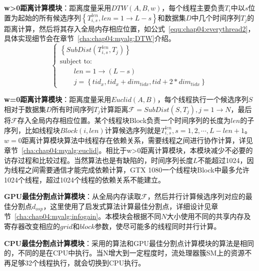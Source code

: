 \textbf{w>0距离计算模块}：距离度量采用$DTW(A,B,w)$，每个线程主要负责$T_i$中以$s$位置为起始的所有候选序列$\left\lbrace T_{i,s}^{len},len=1\to L-s\right\rbrace $和数据集$D$中几个时间序列$T_j$的距离计算，然后将其存入全局内存相应位置，如公式~\ref{equ:chap04:everythread2}，具体实现细节会在章节~\ref{cha:chap04:myalg:DTW}介绍。
\begin{equation}\label{equ:chap04:everythread2}
\left\{\begin{array}{l}
\left\lbrace SubDist(T_{i,s}^{len},T_j) \right\rbrace \\[0.1cm]
\mbox{subject to:}\\[0.1cm]
\qquad len=1\to (L-s)\\[0.1cm]
\qquad j=\left\lbrace tid_x,tid_x+dim_{tidx},tid+2*dim_{tidx}\right\rbrace 
\end{array}\right.
\end{equation}

\textbf{w=0距离计算模块}：距离度量采用$Euclid(A,B)$，每个线程执行一个候选序列$S$相对于数据集$D$所有时间序列$T_j$计算距离$\mathcal{F}=SubDist(S,T_j),j=1\to N$，最后将$\mathcal{F}$存入全局内存相应位置。某个线程块Block负责一个时间序列的长度为$len$的子序列，比如线程块$Block(i,len)$计算候选序列就是$T_{i,s}^{len},s=1,2,\cdots,L-len+1$。$w=0$距离计算模块算法中线程存在依赖关系，需要线程之间进行协作计算，详见章节~\ref{cha:chap04:myalg:euclid}。相比于w>0距离计算模块，本模块减少不必要的访存过程和比较过程。当然算法也是有缺陷的，时间序列长度$L$不能超过1024，因为线程之间需要通信才能完成依赖计算，GTX 1080一个线程块Block中最多允许1024个线程，超过1024个线程的依赖关系不能建立。

\textbf{GPU最佳分割点计算模块}：从全局内存读取$\mathcal{F}$，然后并行计算候选序列对应的最佳分割点$d_{osp}$，这里使用了启发式算法计算最佳分割点，详细设计见章节~\ref{cha:chap04:myalg:infogain}。本模块会根据不同$N$大小使用不同的共享内存及寄存器改变相应的$grid$和$block$参数，使尽可能多的线程同时并行计算。

\textbf{CPU最佳分割点计算模块}：采用的算法和GPU最佳分割点计算模块的算法是相同的，不同的是在CPU中执行。当N增大到一定程度时，流处理器簇SM上的资源不再足够32个线程执行，就会切换到CPU执行。

